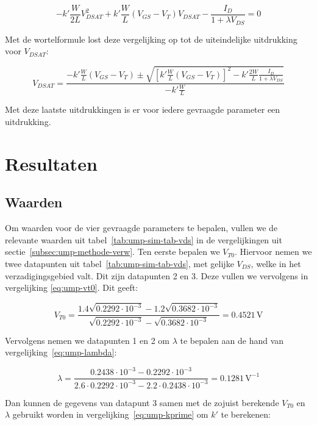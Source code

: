 \documentclass{scrartcl}
\begin{document}
$$-k'\frac{W}{2L}V_{DSAT}^2 + k'\frac{W}{L}(V_{GS}-V_{T})V_{DSAT} - \frac{I_{D}}{1 + \lambda V_{DS}} = 0$$

Met de wortelformule lost deze vergelijking op tot de uiteindelijke uitdrukking voor $V_{DSAT}$:

\begin{equation} \label{eq:ump-vdsat}
	V_{DSAT} = \frac{-k'\frac{W}{L}(V_{GS}-V_{T}) \pm \sqrt{[k'\frac{W}{L}(V_{GS}-V_{T})]^2 - k'\frac{2W}{L}\frac{I_{D}}{1 + \lambda V_{DS}}}}{-k'\frac{W}{L}}
\end{equation}

Met deze laatste uitdrukkingen is er voor iedere gevraagde parameter een uitdrukking.

\section{Resultaten}
\label{sec:ump-res}
\subsection{Waarden}
\label{sec:ump-res-val}
Om waarden voor de vier gevraagde parameters te bepalen, vullen we de relevante waarden uit tabel~\ref{tab:ump-sim-tab-vds} in de vergelijkingen uit sectie~\ref{subsec:ump-methode-verw}.
Ten eerste bepalen we $V_{T0}$. Hiervoor nemen we twee datapunten uit tabel~\ref{tab:ump-sim-tab-vds}, met gelijke $V_{DS}$, welke in het verzadigingsgebied valt. Dit zijn datapunten 2 en 3. Deze vullen we vervolgens in vergelijking \ref{eq:ump-vt0}. Dit geeft:

\begin{equation} \label{ump-vt0-num}
	V_{T0} = \frac{1.4\sqrt{0.2292 \cdot 10^{-3}} - 1.2\sqrt{0.3682 \cdot 10^{-3}}}{\sqrt{0.2292 \cdot 10^{-3}} - \sqrt{0.3682 \cdot 10^{-3}}} = 0.4521 \, \textrm{V}
\end{equation}

Vervolgens nemen we datapunten 1 en 2 om $\lambda$ te bepalen aan de hand van vergelijking~\ref{eq:ump-lambda}:

\begin{equation} \label{ump-lambda-num}
	\lambda = \frac{0.2438 \cdot 10^{-3} - 0.2292 \cdot 10^{-3}}{2.6 \cdot 0.2292 \cdot 10^{-3} - 2.2 \cdot 0.2438 \cdot 10^{-3}} = 0.1281 \, \textrm{V}^{-1}
\end{equation}

Dan kunnen de gegevens van datapunt 3 samen met de zojuist berekende $V_{T0}$ en $\lambda$ gebruikt worden in vergelijking~\ref{eq:ump-kprime} om $k'$ te berekenen:
\end{document}
